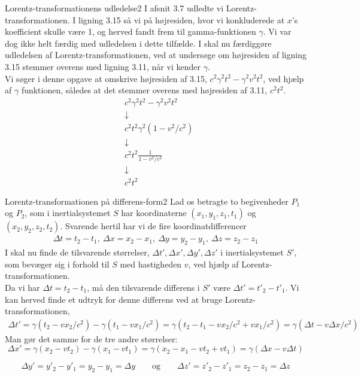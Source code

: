 \documentclass[crop=false, class=memoir]{standalone}
\begin{document}
\begin{opgave}{Lorentz-transformationens udledelse}{2}
	I afsnit 3.7 udledte vi Lorentz-transformationen. I ligning 3.15 så vi på højresiden, hvor vi konkluderede at $x$'s koefficient skulle være 1, og herved fandt frem til gamma-funktionen $\gamma$. Vi var dog ikke helt færdig med udledelsen i dette tilfælde.
	\opg I skal nu færdiggøre udledelsen af Lorentz-transformationen, ved at undersøge om højresiden af ligning 3.15 stemmer overens med ligning 3.11, når vi kender $\gamma$.\\
	
	Vi søger i denne opgave at omskrive højresiden af 3.15, $c^2\gamma^2t^2-\gamma^2v^2t^2$, ved hjælp af $\gamma$ funktionen, således at det stemmer overens med højresiden af 3.11, $c^2t^2$.
	\begin{align*}
		&c^2\gamma^2t^2-\gamma^2v^2t^2 \\
		&\downarrow \\
		&c^2t^2\gamma^2(1-v^2/c^2) \\
		&\downarrow \\
		&c^2t^2\frac{1}{1-v^2/c^2} \\
		&\downarrow \\
		&c^2t^2
	\end{align*}
\end{opgave}

\begin{opgave}{Lorentz-transformationen på differens-form}{2} \label{lorentz_diff2}
	Lad os betragte to begivenheder $P_1$ og $P_2$, som i inertialsystemet $S$ har koordinaterne $(x_1,y_1,z_1,t_1)$ og $(x_2,y_2,z_2,t_2)$. Svarende hertil har vi de fire koordinatdifferencer
	\begin{align}
		\Delta t=t_2-t_1, \	 \Delta x=x_2-x_1, \ \Delta y=y_2-y_1, \ \Delta z= z_2-z_1 \nonumber
	\end{align}
	\opg I skal nu finde de tilsvarende størrelser,
	\begin{math}
		\Delta t',  \Delta x',  \Delta y',  \Delta z'
	\end{math}
	i inertialsystemet $S'$, som bevæger sig i forhold til $S$ med hastigheden $v$, ved hjælp af Lorentz-transformationen.\\
	
	Da vi har $\Delta t=t_2-t_1$, må den tilsvarende differens i $S'$ være $\Delta t'=t'_2-t'_1$. Vi kan herved finde et udtryk for denne differens ved at bruge Lorentz-transformationen,
	\begin{align*}
		\Delta t'=\gamma(t_2-vx_2/c^2)-\gamma(t_1-vx_1/c^2)=\gamma(t_2-t_1-vx_2/c^2+vx_1/c^2)=\gamma(\Delta t-v\Delta x/c^2)
	\end{align*}
	Man gør det samme for de tre andre størrelser:
	$$\Delta x' = \gamma \left( x_2 - vt_2 \right) - \gamma \left( x_1 - vt_1 \right) = \gamma \left( x_2 - x_1 -vt_2 + vt_1 \right) = \gamma \left( \Delta x - v \Delta t \right)$$
	
	$$\Delta y' = y'_2 - y'_1 = y_2 - y_1 = \Delta y \quad \quad \text{og} \quad \quad \Delta z' = z'_2 - z'_1 = z_2 - z_1 = \Delta z$$
\end{opgave}
\end{document}
